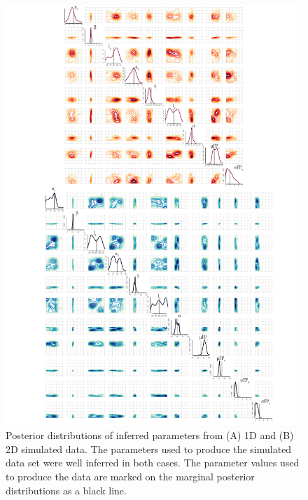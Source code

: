  

\begin{figure}[htbp]
\centering
	\includegraphics[scale=0.7]{../../chapters/chapterABCFlow/images/toy_model_posteriors.pdf}
	\caption[Posterior distributions of inferred parameters from 1D and 2D simulated data]{\label{fig:1d2d-sim-post} Posterior distributions of inferred parameters from (A) 1D and (B) 2D simulated data. The parameters used to produce the simulated data set were well inferred in both cases. The parameter values used to produce the data are marked on the marginal posterior distributions as a black line.}
\end{figure}


